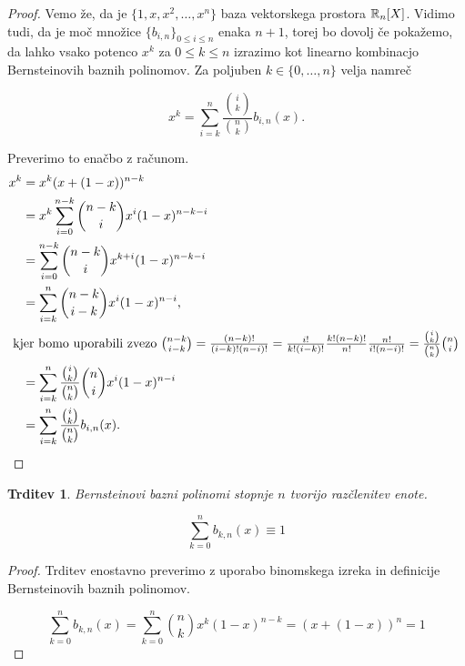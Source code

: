 \documentclass[a4paper, reqno]{amsart}
\theoremstyle{theorem}
\newtheorem{trditev}[izrek]{Trditev}
\theoremstyle{definition}
\begin{document}
\begin{proof}
	Vemo že, da je $\{1, x, x^2, \dots, x^n\}$ baza vektorskega prostora $\mathbb{R}_n[X]$.
	Vidimo tudi, da je moč množice $\{b_{i,n}\}_{0 \leq i \leq n}$ enaka $n + 1$,
	torej bo dovolj če pokažemo, da lahko vsako potenco $x^k$ za $0 \leq k \leq n$
	izrazimo kot linearno kombinacjo Bernsteinovih baznih polinomov. Za poljuben 
	$k \in \{0, \dots, n\}$ velja namreč

	$$ x^k = \sum_{i = k}^{n} \frac{\binom ik}{\binom nk} b_{i, n}(x)\text{.}$$

	Preverimo to enačbo z računom.
	\begin{align*}
	x^k &= x^k(x + (1 - x))^{n - k} \\
	&= x^k \sum_{i = 0}^{n - k} \binom{n - k}{i} x^i(1 - x)^{n - k - i} \\
	&= \sum_{i = 0}^{n - k} \binom{n - k}{i} x^{k + i}(1 - x)^{n - k - i} \\
	&= \sum_{i = k}^{n} \binom{n - k}{i - k} x^i(1 - x)^{n - i} \text{,}\\
\intertext{
	kjer bomo uporabili zvezo $ \binom{n - k}{i - k} = \frac{(n - k)!}{(i - k)!(n - i)!} =
	\frac{i!}{k!(i - k)!} \frac{k! (n - k)!}{n!} \frac{n!}{i!(n - i)!} =
	\frac{\binom ik}{\binom nk} \binom ni $
}
	&= \sum_{i = k}^{n} \frac{\binom ik}{\binom nk} \binom ni x^i(1 - x)^{n - i} \\
	&= \sum_{i = k}^{n} \frac{\binom ik}{\binom nk} b_{i, n}(x)\text{.}
	\end{align*}

\end{proof}

\begin{trditev}
	\label{razclenitev enote}
	Bernsteinovi bazni polinomi stopnje $n$ tvorijo razčlenitev enote.

	$$ \sum_{k=0}^{n}b_{k, n}(x) \equiv 1$$

\end{trditev}

\begin{proof}
	Trditev enostavno preverimo z uporabo binomskega izreka in definicije 
	Bernsteinovih baznih polinomov.

	$$ \sum_{k=0}^{n}b_{k, n}(x) = 
	\sum_{k=0}^{n} \binom nk x^k(1 - x)^{n - k} = 
	(x + (1 - x))^n = 
	1$$

\end{proof}
\end{document}
